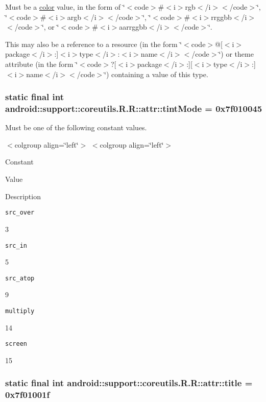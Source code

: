 Must be a \hyperlink{classandroid_1_1support_1_1coreutils_1_1_r_1_1color}{color} value, in the form of \char`\"{}$<$code$>$\#$<$i$>$rgb$<$/i$>$$<$/code$>$\char`\"{}, \char`\"{}$<$code$>$\#$<$i$>$argb$<$/i$>$$<$/code$>$\char`\"{}, \char`\"{}$<$code$>$\#$<$i$>$rrggbb$<$/i$>$$<$/code$>$\char`\"{}, or \char`\"{}$<$code$>$\#$<$i$>$aarrggbb$<$/i$>$$<$/code$>$\char`\"{}. 

This may also be a reference to a resource (in the form \char`\"{}$<$code$>$@\mbox{[}$<$i$>$package$<$/i$>$:\mbox{]}$<$i$>$type$<$/i$>$:$<$i$>$name$<$/i$>$$<$/code$>$\char`\"{}) or theme attribute (in the form \char`\"{}$<$code$>$?\mbox{[}$<$i$>$package$<$/i$>$:\mbox{]}\mbox{[}$<$i$>$type$<$/i$>$:\mbox{]}$<$i$>$name$<$/i$>$$<$/code$>$\char`\"{}) containing a value of this type. \hypertarget{classandroid_1_1support_1_1coreutils_1_1_r_1_1attr_4eb56355438ed06460f6adf40fbe3094}{
\subsubsection[{tintMode}]{\setlength{\rightskip}{0pt plus 5cm}static final int android::support::coreutils.R.R::attr::tintMode = 0x7f010045}}
\label{classandroid_1_1support_1_1coreutils_1_1_r_1_1attr_4eb56355438ed06460f6adf40fbe3094}


Must be one of the following constant values. \begin{TabularC}{0}
\hline
\end{TabularC}
$<$colgroup align=\char`\"{}left\char`\"{}$>$ $<$colgroup align=\char`\"{}left\char`\"{}$>$ 

Constant

Value

Description 

{\tt src\_\-over}

3

{\tt src\_\-in}

5

{\tt src\_\-atop}

9

{\tt multiply}

14

{\tt screen}

15\hypertarget{classandroid_1_1support_1_1coreutils_1_1_r_1_1attr_ac04773fb79ff8c6ca587c732a44cf2e}{
\subsubsection[{title}]{\setlength{\rightskip}{0pt plus 5cm}static final int android::support::coreutils.R.R::attr::title = 0x7f01001f}}
\label{classandroid_1_1support_1_1coreutils_1_1_r_1_1attr_ac04773fb79ff8c6ca587c732a44cf2e}


